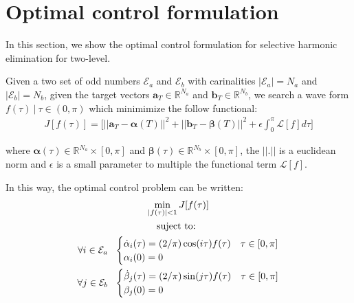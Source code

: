 
\section{Optimal control formulation}

In this section, we show the optimal control formulation for selective harmonic elimination for  two-level.

\begin{problem}\label{OCP1}
    Given  a two set of odd numbers $\mathcal{E}_a$ and $\mathcal{E}_b$ with carinalities $|\mathcal{E}_a| = N_a$ and  $|\mathcal{E}_b| = N_b$, given the target vectors $\bm{a}_T  \in \mathbb{R}^{N_a}$ and $\bm{b}_T  \in \mathbb{R}^{N_b}$, we search a wave form $f(\tau ) \ | \ \tau \in (0,\pi)$ which minimimize the follow functional:
        \begin{gather}
        J[f(\tau)] = \Bigg[ || \bm{a}_T - \bm{\alpha}(T)||^2 + || \bm{b}_T - \bm{\beta}(T)||^2 
        + \epsilon \int_0^{\pi} \mathcal{L}[f] d\tau \Bigg] 
    \end{gather}

    where  $\bm{\alpha}(\tau) \in \mathbb{R}^{N_a} \times [0,\pi]$ and $\bm{\beta}(\tau) \in \mathbb{R}^{N_b}  \times [0,\pi]$, the $||.||$ is a euclidean norm and $\epsilon$ is a small parameter to multiple the functional term $\mathcal{L}[f]$. 
    \newline

    In this way, the optimal control problem can be written: 
    \begin{gather}
        \min_{|f(\tau) |<1} J[f(\tau)] \\
        \notag \text{suject to: } \\
        \notag \forall i \in \mathcal{E}_a\ \ 
        \begin{cases}
            \dot{\alpha}_i(\tau) = (2/\pi) \cos(i\tau) f(\tau) & \tau \in [0,\pi]\label{dyn}\\
            \alpha_i(0) = 0
        \end{cases} \\
        \notag \forall j \in \mathcal{E}_b\ \ 
        \begin{cases}
            \dot{\beta}_j(\tau) = (2/\pi) \sin(j\tau) f(\tau) & \tau \in [0,\pi]\label{dyn}\\
            \beta_j(0) = 0
        \end{cases} \\
    \end{gather}
\end{problem}

